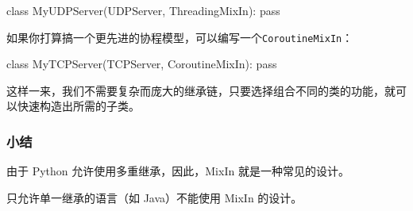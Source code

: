 \begin{pythoncode}
class MyUDPServer(UDPServer, ThreadingMixIn):
    pass
\end{pythoncode}

如果你打算搞一个更先进的协程模型，可以编写一个\texttt{CoroutineMixIn}：

\begin{pythoncode}
class MyTCPServer(TCPServer, CoroutineMixIn):
    pass
\end{pythoncode}

这样一来，我们不需要复杂而庞大的继承链，只要选择组合不同的类的功能，就可以快速构造出所需的子类。

\hypertarget{ux5c0fux7ed3}{%
\subsubsection{小结}\label{ux5c0fux7ed3}}

由于 Python 允许使用多重继承，因此，MixIn 就是一种常见的设计。

只允许单一继承的语言（如 Java）不能使用 MixIn 的设计。

